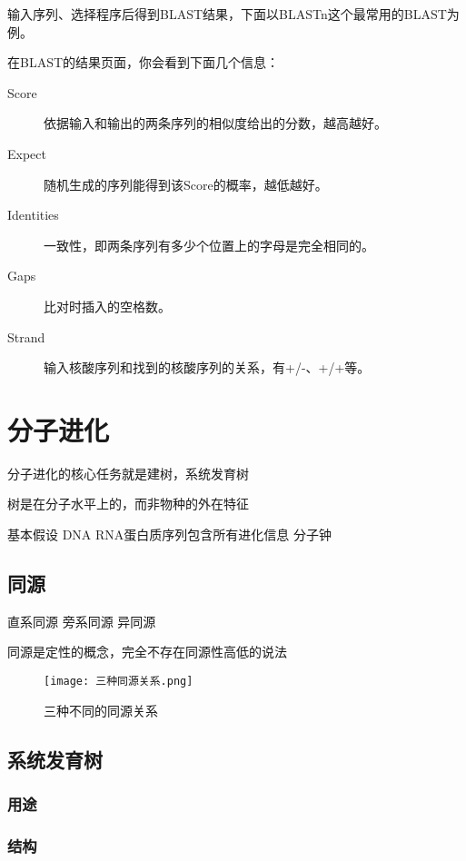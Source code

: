 输入序列、选择程序后得到BLAST结果，下面以BLASTn这个最常用的BLAST为例。

在BLAST的结果页面，你会看到下面几个信息：
\begin{description}
	\item[Score] 依据输入和输出的两条序列的相似度给出的分数，越高越好。
	\item[Expect] 随机生成的序列能得到该Score的概率，越低越好。
	\item[Identities] 一致性，即两条序列有多少个位置上的字母是完全相同的。
	\item[Gaps] 比对时插入的空格数。
	\item[Strand] 输入核酸序列和找到的核酸序列的关系，有+/-、+/+等。
\end{description}




\section{分子进化}

分子进化的核心任务就是建树，系统发育树

树是在分子水平上的，而非物种的外在特征

基本假设 DNA RNA蛋白质序列包含所有进化信息  分子钟

\subsection{同源}

直系同源 旁系同源 异同源

同源是定性的概念，完全不存在同源性高低的说法

\begin{figure}[htbp]
	\centering
	\texttt{[image: 三种同源关系.png]}
	\caption{三种不同的同源关系}
	\label{fig:3homologs}
\end{figure}



\subsection{系统发育树}

\subsubsection{用途}

\subsubsection{结构}

